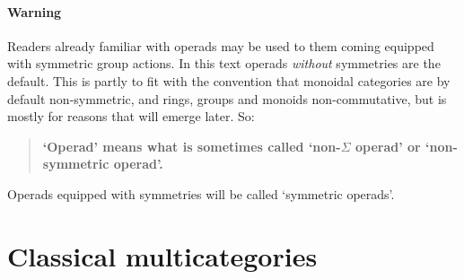 \paragraph*{Warning}%
%
% 
Readers already familiar with operads may be used to them coming equipped
with symmetric group actions.  In this text operads \emph{without}
symmetries are the default.  This is partly to fit with the convention that
monoidal categories are by default non-symmetric, and rings, groups and
monoids non-commutative, but is mostly for reasons that will emerge later.
So:
%
\begin{quote}\centering\bf
`Operad' means what is sometimes called `non-$\Sigma$ operad' or
`non-symmetric operad'.
\end{quote}
% 
Operads equipped with symmetries will be called `symmetric operads'.


\section{Classical multicategories}
%


